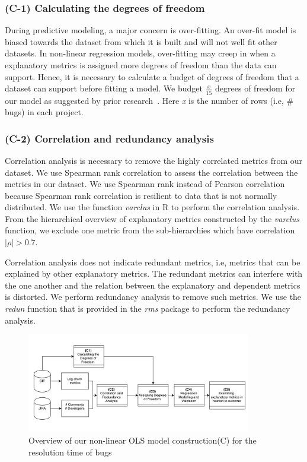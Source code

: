 

\subsubsection*{(C-1) Calculating the degrees of freedom}
During predictive modeling, a major concern is over-fitting. An over-fit model is biased towards the dataset from which it is built and will not well fit other datasets. In non-linear regression models, over-fitting may creep in when a explanatory metrics is assigned more degrees of freedom than the data can support. Hence, it is necessary to calculate a budget of degrees of freedom that a dataset can support before fitting a model. We budget $\frac{x}{15}$ degrees of freedom for our model as suggested by prior research~\cite{DegreesofFreedom}. Here \textsl{x} is the number of rows (i.e, \# bugs) in each project. 


\subsubsection*{(C-2) Correlation and redundancy analysis}

Correlation analysis is necessary to remove the highly correlated metrics from our dataset. We use Spearman rank correlation to assess the correlation between the metrics in our dataset. We use Spearman rank instead of Pearson correlation because Spearman rank correlation is resilient to data that is not normally distributed. We use the function \textsl{varclus} in R to perform the correlation analysis. From the hierarchical overview of explanatory metrics constructed by the \emph{varclus} function, we exclude one metric from the sub-hierarchies which have correlation $|\rho| > 0.7 $.

Correlation analysis does not indicate redundant metrics, i.e, metrics that can be explained by other explanatory metrics. The redundant metrics can interfere with the one another and the relation between the explanatory and dependent metrics is distorted. We perform redundancy analysis to remove such metrics. We use the \textsl{redun} function that is provided in the \textsl{rms} package to perform the redundancy analysis.

\begin{figure}
	\centering
	\includegraphics[width=9.8cm]{MethodologyOLS}
	\caption{Overview of our non-linear OLS model construction(C) for the resolution time of bugs}
	\label{fig:MethodologyOLS}
\end{figure}



